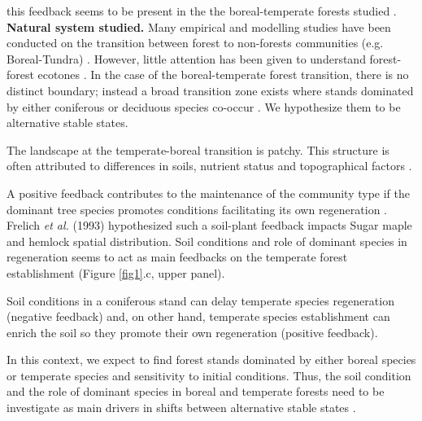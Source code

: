  this feedback seems to be present in the the
boreal-temperate forests studied \cite{Barras1998,Society2014}. \\

\textbf{Natural system studied.} Many empirical and modelling studies have
been conducted on the transition between forest to non-forests communities
(e.g. Boreal-Tundra) \cite{Scheffer2012,Scheffer2001,Hirota2011,Messaoud2007}.
However, little attention has been given to understand forest-forest ecotones
\cite{Goldblum2010,Graignic2013,Messaoud2007}. In the case of the boreal-temperate 
forest transition, there is no distinct boundary; instead a broad transition
zone exists where stands dominated by either coniferous or deciduous species co-occur
\cite{Goldblum2010,Fisichelli2013}. We hypothesize them to be alternative stable states.

The landscape at the temperate-boreal
transition is patchy. This structure is often attributed to
differences in soils, nutrient status and topographical factors
\cite{Society2014}.

A positive feedback contributes to the maintenance of the community type if
the dominant tree species promotes conditions facilitating its own
regeneration \cite{Barras1998}. Frelich \textit{et al.} (1993)
\cite{Society2014} hypothesized such a soil-plant feedback impacts Sugar maple
and hemlock spatial distribution. Soil conditions and role of dominant
species in regeneration seems to act as main feedbacks on the temperate forest
establishment (Figure \ref{fig1}.c, upper panel).

Soil conditions in a coniferous stand can delay
temperate species regeneration (negative feedback) 
and, on other hand,
temperate species establishment can enrich the soil so they promote their own
regeneration (positive feedback).


In this context, we expect to find forest stands dominated by either boreal
species or temperate species and sensitivity to initial conditions. Thus, the
soil condition and the role of dominant species in boreal and temperate
forests need to be investigate as main drivers in shifts between alternative
stable states \cite{Kellman2004,Moore2008,DeFrenne2013,Barras1998}.


